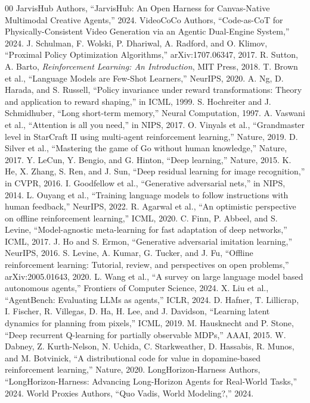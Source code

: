 \documentclass[pdflatex,sn-mathphys-num]{sn-jnl}
\begin{document}
\begin{thebibliography}{00}
 JarvisHub Authors, ``JarvisHub: An Open Harness for Canvas-Native Multimodal Creative Agents,'' 2024.
 VideoCoCo Authors, ``Code-as-CoT for Physically-Consistent Video Generation via an Agentic Dual-Engine System,'' 2024.
 J. Schulman, F. Wolski, P. Dhariwal, A. Radford, and O. Klimov, ``Proximal Policy Optimization Algorithms,'' arXiv:1707.06347, 2017.
 R. Sutton, A. Barto, \textit{Reinforcement Learning: An Introduction}, MIT Press, 2018.
 T. Brown et al., ``Language Models are Few-Shot Learners,'' NeurIPS, 2020.
 A. Ng, D. Harada, and S. Russell, ``Policy invariance under reward transformations: Theory and application to reward shaping,'' in ICML, 1999.
 S. Hochreiter and J. Schmidhuber, ``Long short-term memory,'' Neural Computation, 1997.
 A. Vaswani et al., ``Attention is all you need,'' in NIPS, 2017.
 O. Vinyals et al., ``Grandmaster level in StarCraft II using multi-agent reinforcement learning,'' Nature, 2019.
 D. Silver et al., ``Mastering the game of Go without human knowledge,'' Nature, 2017.
 Y. LeCun, Y. Bengio, and G. Hinton, ``Deep learning,'' Nature, 2015.
 K. He, X. Zhang, S. Ren, and J. Sun, ``Deep residual learning for image recognition,'' in CVPR, 2016.
 I. Goodfellow et al., ``Generative adversarial nets,'' in NIPS, 2014.
 L. Ouyang et al., ``Training language models to follow instructions with human feedback,'' NeurIPS, 2022.
 R. Agarwal et al., ``An optimistic perspective on offline reinforcement learning,'' ICML, 2020.
 C. Finn, P. Abbeel, and S. Levine, ``Model-agnostic meta-learning for fast adaptation of deep networks,'' ICML, 2017.
 J. Ho and S. Ermon, ``Generative adversarial imitation learning,'' NeurIPS, 2016.
 S. Levine, A. Kumar, G. Tucker, and J. Fu, ``Offline reinforcement learning: Tutorial, review, and perspectives on open problems,'' arXiv:2005.01643, 2020.
 L. Wang et al., ``A survey on large language model based autonomous agents,'' Frontiers of Computer Science, 2024.
 X. Liu et al., ``AgentBench: Evaluating LLMs as agents,'' ICLR, 2024.
 D. Hafner, T. Lillicrap, I. Fischer, R. Villegas, D. Ha, H. Lee, and J. Davidson, ``Learning latent dynamics for planning from pixels,'' ICML, 2019.
 M. Hausknecht and P. Stone, ``Deep recurrent Q-learning for partially observable MDPs,'' AAAI, 2015.
 W. Dabney, Z. Kurth-Nelson, N. Uchida, C. Starkweather, D. Hassabis, R. Munos, and M. Botvinick, ``A distributional code for value in dopamine-based reinforcement learning,'' Nature, 2020.
 LongHorizon-Harness Authors, ``LongHorizon-Harness: Advancing Long-Horizon Agents for Real-World Tasks,'' 2024.
 World Proxies Authors, ``Quo Vadis, World Modeling?,'' 2024.
\end{thebibliography}
\end{document}
